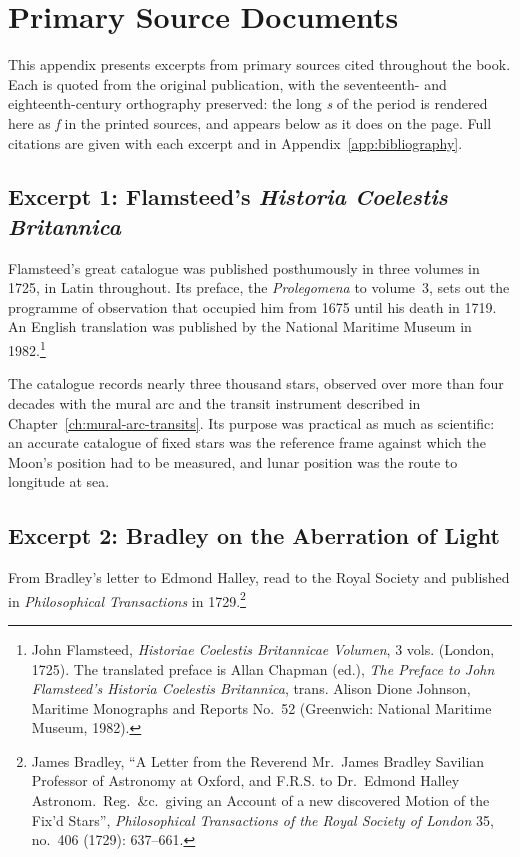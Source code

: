 \chapter{Primary Source Documents}
\label{app:primary-sources}

This appendix presents excerpts from primary sources cited throughout the book. Each is quoted from the original publication, with the seventeenth- and eighteenth-century orthography preserved: the long \emph{s} of the period is rendered here as \emph{f} in the printed sources, and appears below as it does on the page. Full citations are given with each excerpt and in Appendix~\ref{app:bibliography}.

\section{Excerpt 1: Flamsteed's \emph{Historia Coelestis Britannica}}

Flamsteed's great catalogue was published posthumously in three volumes in 1725, in Latin throughout. Its preface, the \emph{Prolegomena} to volume~3, sets out the programme of observation that occupied him from 1675 until his death in 1719. An English translation was published by the National Maritime Museum in 1982.\footnote{John Flamsteed, \emph{Historiae Coelestis Britannicae Volumen}, 3 vols. (London, 1725). The translated preface is Allan Chapman (ed.), \emph{The Preface to John Flamsteed's Historia Coelestis Britannica}, trans. Alison Dione Johnson, Maritime Monographs and Reports No.~52 (Greenwich: National Maritime Museum, 1982).}

The catalogue records nearly three thousand stars, observed over more than four decades with the mural arc and the transit instrument described in Chapter~\ref{ch:mural-arc-transits}. Its purpose was practical as much as scientific: an accurate catalogue of fixed stars was the reference frame against which the Moon's position had to be measured, and lunar position was the route to longitude at sea.

\medskip

\section{Excerpt 2: Bradley on the Aberration of Light}

From Bradley's letter to Edmond Halley, read to the Royal Society and published in \emph{Philosophical Transactions} in 1729.\footnote{James Bradley, ``A Letter from the Reverend Mr.~James Bradley Savilian Professor of Astronomy at Oxford, and F.R.S. to Dr.~Edmond Halley Astronom.\ Reg.\ \&c.\ giving an Account of a new discovered Motion of the Fix'd Stars'', \emph{Philosophical Transactions of the Royal Society of London} 35, no.~406 (1729): 637--661.}

